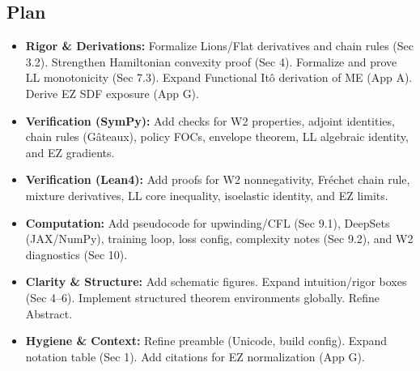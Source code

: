 ﻿\documentclass[11pt,letterpaper,oneside]{article}
\numberwithin{equation}{section}
\newcommand{\1}{\mathbf{1}}
\begin{document}
\begin{tcolorbox}[didacticstyle]
\begin{itemize}[leftmargin=1.1em,itemsep=0.25em]
\subsection*{Plan}
\begin{itemize}[leftmargin=1.2em]
  \item \textbf{Rigor \& Derivations:} Formalize Lions/Flat derivatives and chain rules (Sec 3.2). Strengthen Hamiltonian convexity proof (Sec 4). Formalize and prove LL monotonicity (Sec 7.3). Expand Functional Itô derivation of ME (App A). Derive EZ SDF exposure (App G).
  \item \textbf{Verification (SymPy):} Add checks for W2 properties, adjoint identities, chain rules (Gâteaux), policy FOCs, envelope theorem, LL algebraic identity, and EZ gradients.
  \item \textbf{Verification (Lean4):} Add proofs for W2 nonnegativity, Fréchet chain rule, mixture derivatives, LL core inequality, isoelastic identity, and EZ limits.
  \item \textbf{Computation:} Add pseudocode for upwinding/CFL (Sec 9.1), DeepSets (JAX/NumPy), training loop, loss config, complexity notes (Sec 9.2), and W2 diagnostics (Sec 10).
  \item \textbf{Clarity \& Structure:} Add schematic figures. Expand intuition/rigor boxes (Sec 4–6). Implement structured theorem environments globally. Refine Abstract.
  \item \textbf{Hygiene \& Context:} Refine preamble (Unicode, build config). Expand notation table (Sec 1). Add citations for EZ normalization (App G).
\end{itemize}


\end{itemize}
\end{tcolorbox}
\end{document}
